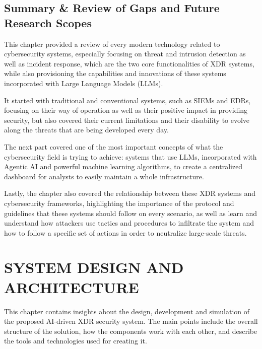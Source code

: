 \documentclass[12pt,a4paper]{report}
\begin{document}
\section{Summary \& Review of Gaps and Future Research Scopes}

This chapter provided a review of every modern technology related to cybersecurity systems,
especially focusing on threat and intrusion detection as well as incident response, which are the
two core functionalities of XDR systems, while also provisioning the capabilities and innovations
of these systems incorporated with Large Language Models (LLMs).

It started with traditional and conventional systems, such as SIEMs and EDRs, focusing on their
way of operation as well as their positive impact in providing security, but also covered their
current limitations and their disability to evolve along the threats that are being developed
every day.

The next part covered one of the most important concepts of what the cybersecurity field is
trying to achieve: systems that use LLMs, incorporated with Agentic AI and powerful machine
learning algorithms, to create a centralized dashboard for analysts to easily maintain a whole
infrastructure.

Lastly, the chapter also covered the relationship between these XDR systems and cybersecurity
frameworks, highlighting the importance of the protocol and guidelines that these systems should
follow on every scenario, as well as learn and understand how attackers use tactics and procedures
to infiltrate the system and how to follow a specific set of actions in order to neutralize
large-scale threats.

\chapter{SYSTEM DESIGN AND ARCHITECTURE}

This chapter contains insights about the design, development and simulation of the proposed
AI-driven XDR security system. The main points include the overall structure of the solution,
how the components work with each other, and describe the tools and technologies used for
creating it.
\end{document}

